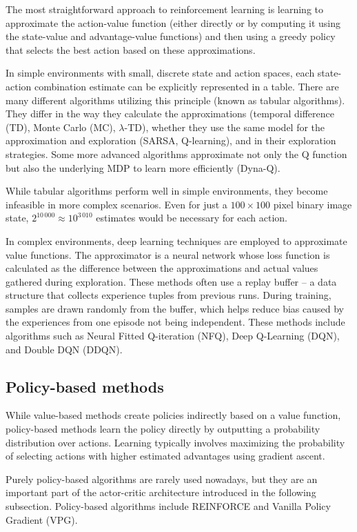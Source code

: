 \documentclass[
  digital,     %
  oneside,     %
  nosansbold,  %
  nocolorbold, %
  lof,         %
  lot,         %
]{fithesis4}
\begin{document}
The most straightforward approach to reinforcement learning is learning to approximate the action-value function (either directly or by computing it using the state-value and advantage-value functions) and then using a greedy policy that selects the best action based on these approximations.

In simple environments with small, discrete state and action spaces, each state-action combination estimate can be explicitly represented in a table. There are many different algorithms utilizing this principle (known as tabular algorithms). They differ in the way they calculate the approximations (temporal difference (TD), Monte Carlo (MC), $\lambda$-TD), whether they use the same model for the approximation and exploration (SARSA, Q-learning), and in their exploration strategies. Some more advanced algorithms approximate not only the Q function but also the underlying MDP to learn more efficiently (Dyna-Q).

While tabular algorithms perform well in simple environments, they become infeasible in more complex scenarios. Even for just a $100 \times 100$ pixel binary image state, $2^{10\,000} \approx 10^{3\,010}$ estimates would be necessary for each action.

In complex environments, deep learning techniques are employed to approximate value functions. The approximator is a neural network whose loss function is calculated as the difference between the approximations and actual values gathered during exploration. These methods often use a replay buffer -- a data structure that collects experience tuples from previous runs. During training, samples are drawn randomly from the buffer, which helps reduce bias caused by the experiences from one episode not being independent. These methods include algorithms such as Neural Fitted Q-iteration (NFQ), Deep Q-Learning (DQN), and Double DQN (DDQN).

\subsection{Policy-based methods}

While value-based methods create policies indirectly based on a value function, policy-based methods learn the policy directly by outputting a probability distribution over actions. Learning typically involves maximizing the probability of selecting actions with higher estimated advantages using gradient ascent.

Purely policy-based algorithms are rarely used nowadays, but they are an important part of the actor-critic architecture introduced in the following subsection. Policy-based algorithms include REINFORCE and Vanilla Policy Gradient (VPG).
\end{document}
